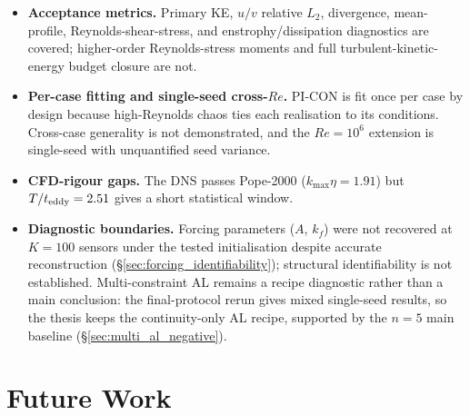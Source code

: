 \begin{itemize}
    \item \textbf{Acceptance metrics.} Primary KE, $u/v$ relative $L_2$, divergence, mean-profile, Reynolds-shear-stress, and enstrophy/dissipation diagnostics are covered; higher-order Reynolds-stress moments and full turbulent-kinetic-energy budget closure are not.
    \item \textbf{Per-case fitting and single-seed cross-$Re$.} PI-CON is fit once per case by design because high-Reynolds chaos ties each realisation to its conditions. Cross-case generality is not demonstrated, and the $Re=10^6$ extension is single-seed with unquantified seed variance.
    \item \textbf{CFD-rigour gaps.} The DNS passes Pope-2000 ($k_{\max}\eta=1.91$) but $T/t_{\rm eddy}=2.51$ gives a short statistical window.
    \item \textbf{Diagnostic boundaries.} Forcing parameters ($A$, $k_f$) were not recovered at $K=100$ sensors under the tested initialisation despite accurate reconstruction (\S\ref{sec:forcing_identifiability}); structural identifiability is not established. Multi-constraint AL remains a recipe diagnostic rather than a main conclusion: the final-protocol rerun gives mixed single-seed results, so the thesis keeps the continuity-only AL recipe, supported by the $n=5$ main baseline (\S\ref{sec:multi_al_negative}).
\end{itemize}

\section{Future Work}
\label{sec:future_work}

